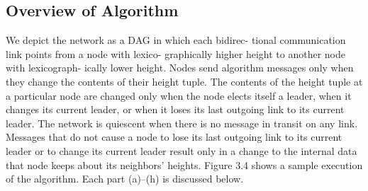\documentclass{article}
\begin{document}
\subsection{Overview of Algorithm}
We depict the network as a DAG in which each bidirec-
tional communication link points from a node with lexico-
graphically higher height to another node with lexicograph-
ically lower height. Nodes send algorithm messages only
when they change the contents of their height tuple. The
contents of the height tuple at a particular node are changed
only when the node elects itself a leader, when it changes its
current leader, or when it loses its last outgoing link to its
current leader. The network is quiescent when there is no
message in transit on any link. Messages that do not cause
a node to lose its last outgoing link to its current leader or
to change its current leader result only in a change to the
internal data that node keeps about its neighbors’ heights.
Figure 3.4 shows a sample execution of the algorithm.
Each part (a)–(h) is discussed below.
\end{document}
